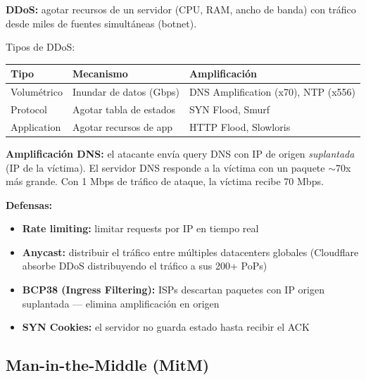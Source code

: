 \begin{cuidado}
\textbf{DDoS:} agotar recursos de un servidor (CPU, RAM, ancho de banda)
con tráfico desde miles de fuentes simultáneas (botnet).

Tipos de DDoS:

\begin{center}
\renewcommand{\arraystretch}{1.3}
\begin{tabular}{lll}
\toprule
\textbf{Tipo} & \textbf{Mecanismo} & \textbf{Amplificación} \\
\midrule
Volumétrico & Inundar de datos (Gbps) & DNS Amplification (x70), NTP (x556) \\
Protocol    & Agotar tabla de estados & SYN Flood, Smurf \\
Application & Agotar recursos de app  & HTTP Flood, Slowloris \\
\bottomrule
\end{tabular}
\end{center}

\textbf{Amplificación DNS:} el atacante envía query DNS con IP de origen
\textit{suplantada} (IP de la víctima). El servidor DNS responde a la víctima
con un paquete $\sim$70x más grande. Con 1 Mbps de tráfico de ataque,
la víctima recibe 70 Mbps.

\textbf{Defensas:}
\begin{itemize}
    \item \textbf{Rate limiting:} limitar requests por IP en tiempo real
    \item \textbf{Anycast:} distribuir el tráfico entre múltiples datacenters globales
          (Cloudflare absorbe DDoS distribuyendo el tráfico a sus 200+ PoPs)
    \item \textbf{BCP38 (Ingress Filtering):} ISPs descartan paquetes con IP origen
          suplantada --- elimina amplificación en origen
    \item \textbf{SYN Cookies:} el servidor no guarda estado hasta recibir el ACK
\end{itemize}
\end{cuidado}

\subsection{Man-in-the-Middle (MitM)}

